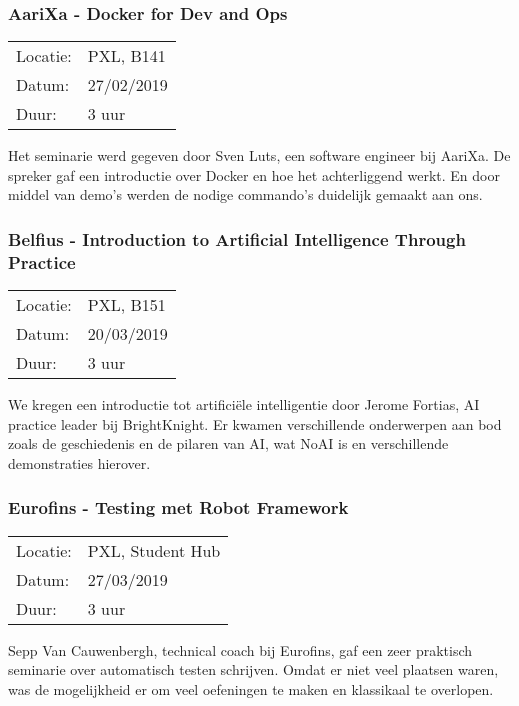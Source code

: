\subsubsection{AariXa - Docker for Dev and Ops}

\begin{tabular}{l l}
  Locatie: & PXL, B141\\
  Datum: & 27/02/2019\\
  Duur: & 3 uur
\end{tabular}

Het seminarie werd gegeven door Sven Luts, een software engineer bij AariXa. De spreker gaf een introductie over Docker en hoe het achterliggend werkt. En door middel van demo's werden de nodige commando's duidelijk gemaakt aan ons.

\subsubsection{Belfius - Introduction to Artificial Intelligence Through Practice}

\begin{tabular}{l l}
  Locatie: & PXL, B151\\
  Datum: & 20/03/2019\\
  Duur: & 3 uur
\end{tabular}

We kregen een introductie tot artificiële intelligentie door Jerome Fortias, AI practice leader bij BrightKnight. Er kwamen verschillende onderwerpen aan bod zoals de geschiedenis en de pilaren van AI, wat NoAI is en verschillende demonstraties hierover.

\subsubsection{Eurofins - Testing met Robot Framework}

\begin{tabular}{l l}
  Locatie: & PXL, Student Hub\\
  Datum: & 27/03/2019\\
  Duur: & 3 uur
\end{tabular}

Sepp Van Cauwenbergh, technical coach bij Eurofins, gaf een zeer praktisch seminarie over automatisch testen schrijven. Omdat er niet veel plaatsen waren, was de mogelijkheid er om veel oefeningen te maken en klassikaal te overlopen.

